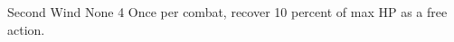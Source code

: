 \CreatePerk
  {Second Wind} %
  {None} %
  {4} %
  {Once per combat, recover 10 percent of max HP as a free action.} %